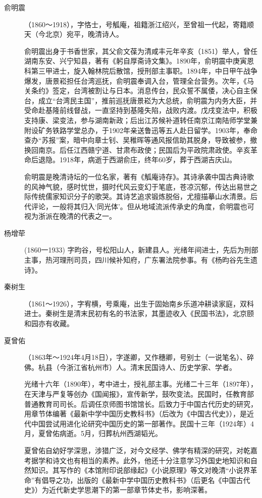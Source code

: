 \begin{description}
  \item[俞明震] （1860～1918），字恪士，号觚庵，祖籍浙江绍兴，至曾祖一代起，寄籍顺天（今北京）宛平，晚清诗人。\par
        俞明震出身于书香世家，其父俞文葆为清咸丰元年辛亥（1851）举人，曾任湖南东安、兴宁知县，著有《躬自厚斋诗文集》。1890年，俞明震中庚寅恩科第三甲进士，旋入翰林院后散馆，授刑部主事职。1894年，中日甲午战争爆发，唐景崧担任台湾巡抚，俞明震奉调入台，管理全台营务。次年，《马关条约》签定，台湾被割让与日本。消息传台，民众誓不属倭，决心自主保台，成立“台湾民主国”，推前巡抚唐景崧为大总统，俞明震为内务大臣，并受命赴基隆前线督战，一直坚持到基隆失陷，战败内渡。戊戌变法中，积极支持康、梁变法，参与湖南新政；后出江苏候补道转任南京江南陆师学堂兼附设矿务铁路学堂总办，于1902年亲送鲁迅等五人赴日留学。1903年，奉命查办“苏报”案，暗中向章士钊、吴稚晖等通风报信助其脱身，导致被参，撤换回南京。后任江西赣宁道、甘肃布政使；民国后为平政院肃政使。辛亥革命后退隐。1918年，病逝于西湖俞庄，终年60岁，葬于西湖吉庆山。\par
        俞明震是晚清诗坛的一位名家，著有《觚庵诗存》。其诗承袭中国古典诗歌的风神气貌，感时忧世，摄时代风云变幻于笔底，苍凉沉郁，传达出易世之际传统儒家知识分子的歌哭。其诗艺追求锻炼脱俗，尤擅描摹山水清景。后代评论，一般将其归入‘同光体’。但从地域流派传承史的角度，俞明震也可视为浙派在晚清的代表之一。
  \item[杨增荦] (1860一1933) 字昀谷，号松阳山人，新建县人。光绪年间进士，先后为刑部主事，热河理刑司员，四川候补知府，广东署法院参事。有《杨昀谷先生遗诗》。
  \item[秦树生] （1861～1926），字宥横，号乘庵，出生于固始南乡乐道冲耕读家庭，双科进士。秦树生是清末民初有名的书法家，其墨迹收入《民国书法》，北京颐和园亦有收藏。
  \item[夏曾佑] （1863年～1924年4月18日），字遂卿，又作穗卿，号别士（一说笔名）、碎佛。杭县（今浙江省杭州市）人。清末民国诗人、历史学家、学者。\par
        光绪十六年（1890年），考中进士，授礼部主事。光绪二十三年（1897年），在天津与严复等创办《国闻报》，宣传新学，鼓吹变法。民国时，任教育部普通教育司司长。后调任京师图书馆馆长。后致力于中国古代历史的研究，用章节体编著《最新中学中国历史教科书》（后改为《中国古代史》），是近代中国尝试用进化论研究中国历史的第一部著作。民国十三年（1924年）4月，夏曾佑病逝。5月，归葬杭州西湖韬光。\par
        夏曾佑自幼好学深思，涉猎广泛，对今文经学、佛学有精深的研究，对乾嘉考据学和诗文也有相当的素养。此外，他还十分注意学习外国史地知识和自然知识。其写作的《本馆附印说部缘起》《小说原理》等文对晚清“小说界革命”有倡导之功，出版的《最新中学中国历史教科书》（后更名《中国古代史》）为近代新史学思潮下的第一部章节体史书，影响深著。

\end{description}
